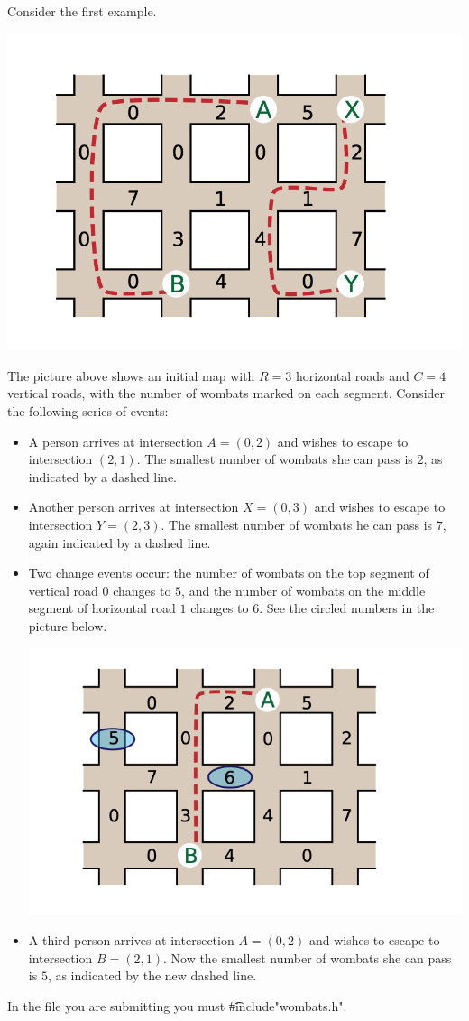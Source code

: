 Consider the first example.

\includegraphics{wombats2.png}

The picture above shows an initial map with $R = 3$ horizontal roads and $C = 4$ vertical roads, with the number of wombats marked on each segment. Consider the following series of events:
\begin{itemize}
\item A person arrives at intersection $A = (0, 2)$ and wishes to escape to intersection $(2, 1)$. The smallest number of wombats she can pass is $2$, as indicated by a dashed line.
\item Another person arrives at intersection $X = (0, 3)$ and wishes to escape to intersection $Y = (2, 3)$. The smallest number of wombats he can pass is $7$, again indicated by a dashed line.
\item Two change events occur: the number of wombats on the top segment of vertical road $0$ changes to $5$, and the number of wombats on the middle segment of horizontal road $1$ changes to $6$. See the circled numbers in the picture below.

\includegraphics{wombats3.png}

\item A third person arrives at intersection $A = (0, 2)$ and wishes to escape to intersection $B = (2, 1)$. Now the smallest number of wombats she can pass is $5$, as indicated by the new dashed line.
\end{itemize}

In the file you are submitting you must \t{\#include"wombats.h"}.